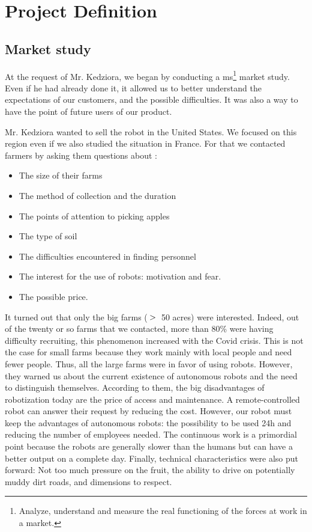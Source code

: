 \section{Project Definition}\insertloftspace
\setcounter{figure}{0}\setcounter{table}{0}

\subsection{Market study}

At the request of Mr. Kedziora, we began by conducting a \gls{ms}\footnote{Analyze, understand and measure the real functioning of the forces at work in a market.} market study. Even if he had already done it, it allowed us to better understand the expectations of our customers, and the possible difficulties. It was also a way to have the point of future users of our product.

\bigbreak
Mr. Kedziora wanted to sell the robot in the United States. We focused on this region even if we also studied the situation in France. For that we contacted farmers by asking them questions about : 
\begin{itemize}[noitemsep]
    \item The size of their farms
    \item The method of collection and the duration
    \item The points of attention to picking apples
    \item The type of soil
    \item The difficulties encountered in finding personnel
    \item The interest for the use of robots: motivation and fear.
    \item The possible price.
\end{itemize}

It turned out that only the big farms ($\bg$ 50 acres) were interested. Indeed, out of the twenty or so farms that we contacted, more than 80\% were having difficulty recruiting, this phenomenon increased with the Covid crisis. This is not the case for small farms because they work mainly with local people and need fewer people. Thus, all the large farms were in favor of using robots. However, they warned us about the current existence of autonomous robots and the need to distinguish themselves. According to them, the big disadvantages of robotization today are the price of access and maintenance. A remote-controlled robot can answer their request by reducing the cost. However, our robot must keep the advantages of autonomous robots: the possibility to be used 24h and reducing the number of employees needed. The continuous work is a primordial point because the robots are generally slower than the humans but can have a better output on a complete day. Finally, technical characteristics were also put forward: Not too much pressure on the fruit, the ability to drive on potentially muddy dirt roads, and dimensions to respect.

